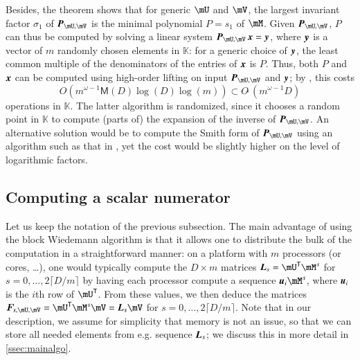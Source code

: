 \documentclass[final,1p,times,authoryear]{elsarticle}
\newcommand{\mat}[1]{\bm{\MakeUppercase{#1}}} %
\newcommand{\row}[1]{\bm{\MakeLowercase{#1}}} %
\newcommand{\col}[1]{\bm{\MakeLowercase{#1}}} %
\newcommand{\seqelt}[1]{\bm{F}_{#1}} %
\newcommand{\softO}[1]{O{\tilde{~}}(#1)} %
\newcommand{\minpoly}{P}
\newcommand{\trsp}[1]{#1^{\mathsf{T}}} %
\def\M {\ensuremath{\mathsf{M}}}
\def\K{\mathbb{K}}
\def\K {\ensuremath{\mathbb{K}}}
\newcommand{\mUt}{\trsp{\mU}}
\begin{document}
Besides, the theorem shows that for generic $\mU$ and $\mV$, the
largest invariant factor $\sigma_1$ of $\mat{P}_{\mU,\mV}$ is the
minimal polynomial $\minpoly=s_1$ of $\mM$.  Given $\mat{P}_{\mU,\mV}$,
$\minpoly$ can thus be computed by solving a linear system
$\mat{P}_{\mU,\mV} \, \col{x} = \col{y}$, where $\col{y}$ is a vector of
$m$ randomly chosen elements in $\K$: for a generic choice of
$\col{y}$, the least common multiple of the denominators of the
entries of $\col{x}$ is $\minpoly$.  Thus, both $\minpoly$ and $\col{x}$
can be computed using
high-order lifting \citep[Algorithm~5]{Stor03} on input
$\mat{P}_{\mU,\mV}$ and $\col{y}$; by
\citep[Corollary~16]{Stor03}, this costs
\begin{equation}\label{eqn:hol_cost}
  O(m^{\omega-1} \M(D) \log(D)\log(m)) \subset \softO{m^{\omega-1}D}
  \end{equation}
operations in $\K$.  The latter algorithm is randomized, since it
chooses a random point in $\K$ to compute (parts of) the expansion of
the inverse of $\mat{P}_{\mU,\mV}$. An alternative solution would be
to compute the Smith form of $\mat{P}_{\mU,\mV}$ using an algorithm
such as that in \citep[Section~17]{Stor03}, yet the cost would be
slightly higher on the level of logarithmic factors.



\subsection{Computing a scalar numerator}\label{ssec:scalar_numer}

Let us keep the notation of the previous subsection.  The main
advantage of using the block Wiedemann algorithm is that it allows one
to distribute the bulk of the computation in a straightforward manner:
on a platform with $m$ processors (or cores, \dots), one would
typically compute the $D \times m$ matrices $\mat{L}_s=\mUt\mM^s$
for $s=0,\dots,2\lceil D/m \rceil$ by having each processor compute a
sequence $\row{u}_i \mM^s$, where $\row{u}_i$ is the $i$th row of
$\mUt$. From these values, we then deduce the matrices
$\seqelt{s,\mU,\mV}=\mUt \mM^s \mV = \mat{L}_s\mV$ for
$s=0,\dots,2\lceil D/m \rceil$. Note that in our description, we
assume for simplicity that memory is not an issue, so that we can
store all needed elements from e.g. sequence $\mat{L}_s$; we discuss
this in more detail in \cref{ssec:mainalgo}.
\end{document}
